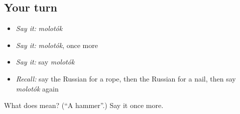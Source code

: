 \subsection*{Your turn}
\begin{itemize}
\raggedright
  \item \emph{Say it:} \emph{molotók}
  \item \emph{Say it:} \emph{molotók}, once more
  \item \emph{Say it:} say \emph{molotók}
  \item \emph{Recall:} say the Russian for a rope, then the Russian for a nail, then say \emph{molotók} again
\end{itemize}

\begin{tcolorbox}[breakable,colback=teal!4,colframe=teal!35!black,title={Before you move on}]
What does  mean? (\textquotedblleft{}A hammer\textquotedblright{}.) Say it once more.
\end{tcolorbox}
